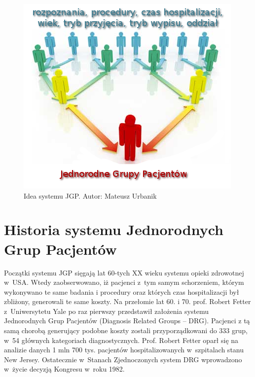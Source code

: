\vspace*{1cm}
\begin{figure}[!ht]
\centering
\includegraphics[scale=0.8]{images/standarization}
\caption[Rysunek przedstawiający ideę systemu JGP]{Idea systemu JGP. Autor: Mateusz Urbanik}
\label{img:rysunek_jgp}
\end{figure}


\section{Historia systemu Jednorodnych Grup Pacjentów}
\label{sec:historiaJGP}

Początki systemu JGP sięgają lat 60-tych XX wieku systemu opieki zdrowotnej w~USA. Wtedy zaobserwowano, iż pacjenci z~tym samym schorzeniem, którym wykonywano te same badania i procedury oraz których czas hospitalizacji był zbliżony, generowali te same koszty. Na przełomie lat 60. i 70. prof. Robert Fetter z~Uniwersytetu Yale po raz pierwszy przedstawił założenia systemu Jednorodnych Grup Pacjentów (Diagnosis Related Groups – DRG). Pacjenci z tą samą chorobą generujący podobne koszty zostali przyporządkowani do 333 grup, w~54 głównych kategoriach diagnostycznych. Prof. Robert Fetter oparł się na analizie danych 1 mln 700 tys. pacjentów hospitalizowanych w~szpitalach stanu New Jersey. Ostatecznie w~Stanach Zjednoczonych system DRG wprowadzono w~życie decyzją Kongresu w~roku 1982\cite{kozierkiewicz_jgp}.

